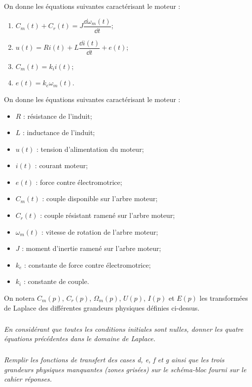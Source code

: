 \documentclass[10pt,fleqn]{article} %
\begin{document}
\begin{multicols}{2}
On donne les équations suivantes caractérisant le moteur :
\begin{enumerate}
\item $C_m(t)+C_r(t)=J\dfrac{\dd \omega_m(t)}{\dd t}$;
\item $u(t)=Ri(t)+L\dfrac{\dd i(t)}{\dd t}+e(t)$;
\item $C_m(t)=k_i i(t)$;
\item $e(t)=k_e\omega_m(t)$.
\end{enumerate}

On donne les équations suivantes caractérisant le moteur :

\begin{itemize}
\item $R$ : résistance de l'induit;
\item $L$ : inductance de l'induit;
\item $u(t)$ : tension d'alimentation du moteur;
\item $i(t)$ : courant moteur;
\item $e(t)$ : force contre électromotrice;
\item $C_m(t)$ : couple disponible sur l'arbre moteur;
\item $C_r(t)$ : couple résistant ramené sur l'arbre moteur;
\item $\omega_m(t)$ : vitesse de rotation de l'arbre moteur;
\item $J$ : moment d'inertie ramené sur l'arbre moteur;
\item $k_e$ : constante de force contre électromotrice;
\item $k_i$ : constante de couple.
\end{itemize}

On notera $C_m(p)$, $C_r(p)$, $\Omega_m(p)$, $U(p)$, $I(p)$ et $E(p)$ les transformées de Laplace des différentes grandeurs physiques définies ci-dessus.

\subparagraph{}
\textit{En considérant que toutes les conditions initiales sont nulles, donner les quatre équations précédentes dans le domaine de Laplace.}

\subparagraph{}
\textit{Remplir les fonctions de transfert des cases d, e, f et g ainsi que les trois grandeurs physiques manquantes (zones grisées) sur le schéma-bloc fourni sur le cahier réponses.}
%
%


\end{multicols}
\end{document}
